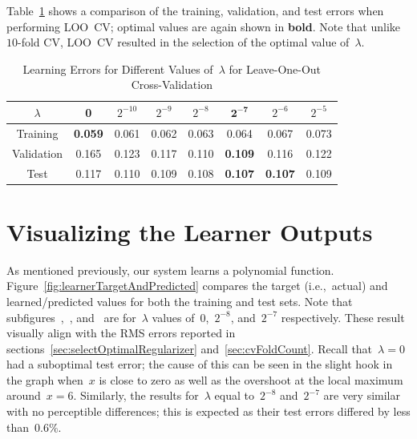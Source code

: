 \documentclass{report}
\begin{document}
  Table~\ref{tab:lambdaLooError} shows a comparison of the training, validation, and test errors when performing LOO~CV; optimal values are again shown in \textbf{bold}.  Note that unlike $10$-fold CV, LOO~CV resulted in the selection of the optimal value of~$\lambda$.
  
   \begin{table}[tb]
    \centering
    \caption{Learning Errors for Different Values of~$\lambda$ for Leave-One-Out Cross-Validation}\label{tab:lambdaLooError}
    \begin{tabular}{c||c|c|c|c|c|c|c}
      \hline
      $\lambda$  & 0     & $2^{-10}$ & $2^{-9}$ & $2^{-8}$ & $\mathbf{2^{-7}}$ & $2^{-6}$ & $2^{-5}$ \\ \hline\hline
      Training   & \textbf{0.059} & 0.061      & 0.062     & 0.063     & 0.064          & 0.067    & 0.073   \\ \hline
      Validation & 0.165          & 0.123      & 0.117     & 0.110     & \textbf{0.109} & 0.116    & 0.122   \\ \hline
      Test       & 0.117          & 0.110      & 0.109     & 0.108     & \textbf{0.107} & \textbf{0.107}    & 0.109   \\ \hline
    \end{tabular}
  \end{table}

  
  \section{Visualizing the Learner Outputs}
  
  As mentioned previously, our system learns a polynomial function.  Figure~\ref{fig:learnerTargetAndPredicted} compares the target (i.e.,~actual) and learned/predicted values for both the training and test sets.  Note that subfigures~,~, and~ are for~$\lambda$ values of~$0$,~$2^{-8}$, and~$2^{-7}$ respectively.  These result visually align with the RMS errors reported in sections~\ref{sec:selectOptimalRegularizer} and~\ref{sec:cvFoldCount}.  Recall that~${\lambda=0}$ had a suboptimal test error; the cause of this can be seen in the slight hook in the graph when~$x$ is close to zero as well as the overshoot at the local maximum around~${x=6}$.  Similarly, the results for~$\lambda$ equal to~$2^{-8}$ and~$2^{-7}$ are very similar with no perceptible differences; this is expected as their test errors differed by less than~$0.6\%$.
  
\end{document}
